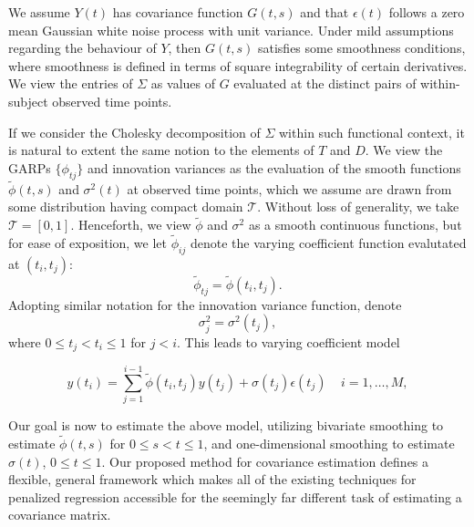 \documentclass[12pt]{article}
\theoremstyle{definition}
\begin{document}
We assume $Y\left(t\right)$ has covariance function $G\left(t,s\right)$ and that $\epsilon\left(t\right)$ follows a zero mean Gaussian white noise process with unit variance. Under mild assumptions regarding the behaviour of $Y$, then $G\left(t,s\right)$ satisfies some smoothness conditions, where smoothness is defined in terms of square integrability of certain derivatives. We view the entries of $\Sigma$ as values of $G$ evaluated at the distinct pairs of within-subject observed time points. 
\bigskip


If we consider the Cholesky decomposition of $\Sigma$ within such functional context, it is natural to extent the same notion to the elements of $T$ and $D$. We view the GARPs $\lbrace \phi_{tj} \rbrace$ and innovation variances as the evaluation of the smooth functions $\tilde{\phi}\left(t,s\right)$ and $\sigma^2\left(t\right)$ at observed time points, which we assume  are drawn from some distribution having compact domain $\mathcal{T}$. Without loss of generality, we take $\mathcal{T} = \left[0,1\right]$. Henceforth, we view $\tilde{\phi}$ and $\sigma^2$ as a smooth continuous functions, but for ease of exposition, we let $\tilde{\phi}_{ij}$ denote the varying coefficient function evalutated at $\left(t_i,t_j\right)$: 
\[
\tilde{\phi}_{tj} = \tilde{\phi}\left(t_{i},t_{j}\right). 
\]
Adopting similar notation for the innovation variance function, denote
\[
\sigma_{j}^2 = \sigma^2\left(t_{j}\right),
\]
where $0 \le t_{j} < t_{i} \le 1$ for $j < i$. This leads to varying coefficient model

\begin{equation}  \label{eq:cholesky-regression-model-1} 
y\left(t_{i} \right)  = \sum_{j=1}^{i-1} \tilde{\phi}\left(t_{i} ,t_{j}\right) y\left(t_{j}\right) + \sigma\left(t_{j}\right)\epsilon\left({t_j}\right) \;\;\;\; i=1,\dots, M, 
\end{equation}
\noindent

Our goal is now to estimate the above model, utilizing bivariate smoothing to estimate $\tilde{\phi}\left(t,s\right)$ for $0 \le s < t \le 1$,  and one-dimensional smoothing to estimate $\sigma\left(t \right)$, $0 \le t \le 1$. Our proposed method for covariance estimation defines a flexible, general framework which makes all of the existing techniques for penalized regression accessible for the seemingly far different task of estimating a covariance matrix.

\bigskip
\end{document}
